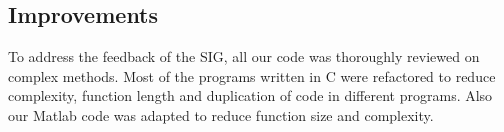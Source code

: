 \subsection{Improvements}
To address the feedback of the SIG, all our code was thoroughly reviewed on complex methods. Most of the programs written in C were refactored to reduce complexity, function length and duplication of code in different programs. Also our Matlab code was adapted to reduce function size and complexity.
 
